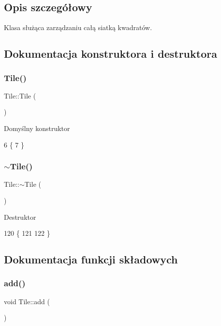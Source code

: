 \subsection{Opis szczegółowy}
Klasa służąca zarządzaniu całą siatką kwadratów. 

\subsection{Dokumentacja konstruktora i destruktora}
\mbox{\label{class_tile_aeeb5593bb6b75aae2edfcccbc84ab378}} 
\subsubsection{\texorpdfstring{Tile()}{Tile()}}
{\footnotesize\ttfamily Tile\+::\+Tile (\begin{DoxyParamCaption}{ }\end{DoxyParamCaption})}

Domyślny konstruktor 
\begin{DoxyCode}
6 \{
7 \}
\end{DoxyCode}
\mbox{\label{class_tile_a98634abbd93fa13d0578d7103202d03d}} 
\subsubsection{\texorpdfstring{$\sim$\+Tile()}{~Tile()}}
{\footnotesize\ttfamily Tile\+::$\sim$\+Tile (\begin{DoxyParamCaption}{ }\end{DoxyParamCaption})}

Destruktor 
\begin{DoxyCode}
120 \{
121 
122 \}
\end{DoxyCode}


\subsection{Dokumentacja funkcji składowych}
\mbox{\label{class_tile_a89f236ddba83484658f4f68e117a786e}} 
\subsubsection{\texorpdfstring{add()}{add()}}
{\footnotesize\ttfamily void Tile\+::add (\begin{DoxyParamCaption}{ }\end{DoxyParamCaption})}

